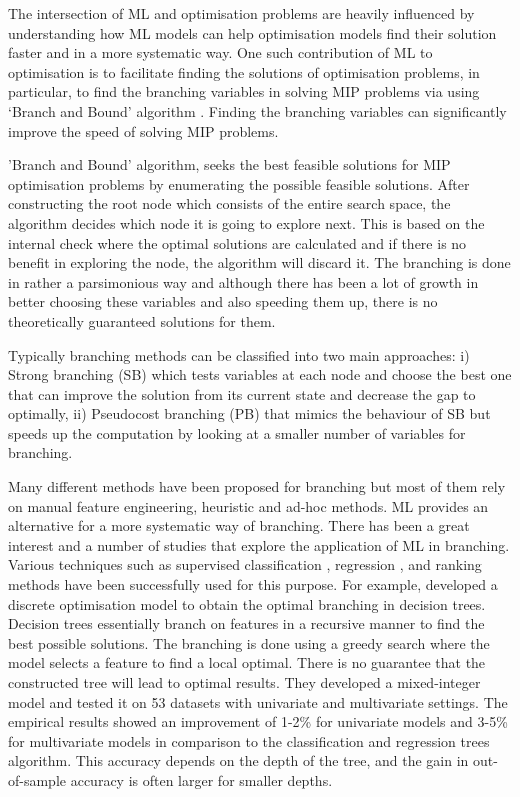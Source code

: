 \documentclass[graybox]{svmult}
\begin{document}
The intersection of ML and optimisation problems are heavily influenced by understanding how ML models can help optimisation models find their solution faster and in a more systematic way. One such contribution of ML to optimisation is to facilitate finding the solutions of optimisation problems, in particular, to find the branching variables in solving MIP problems via using `Branch and Bound' algorithm \cite{bertsimas2017optimal}. Finding the branching variables can significantly improve the speed of solving MIP problems.

'Branch and Bound' algorithm, seeks the best feasible solutions for MIP optimisation problems by enumerating the possible feasible solutions. After constructing the root node which consists of the entire search space, the algorithm decides which node it is going to explore next. This is based on the internal check where the optimal solutions are calculated and if there is no benefit in exploring the node, the algorithm will discard it.  The branching is done in rather a parsimonious way and although there has been a lot of growth in better choosing these variables and also speeding them up, there is no theoretically guaranteed solutions for them. 


Typically branching methods can be classified into two main approaches: i) Strong branching (SB) which tests variables at each node and choose the best one that can improve the solution from its current state and decrease the gap to optimally, ii) Pseudocost branching (PB) that mimics the behaviour of SB but speeds up the computation by looking at a smaller number of variables for branching. 

Many different methods have been proposed for branching but most of them rely on manual feature engineering, heuristic and ad-hoc methods. ML provides an alternative for a more systematic way of branching.  There has been a great interest and a number of studies that explore the application of ML in branching. Various techniques such as supervised classification \cite{marcos2015machine}, regression \cite{Daume_undated-vo}, and ranking \cite{Khalil_undated-qm} methods have been successfully used for this purpose. For example, \citet{bertsimas2017optimal} developed a discrete optimisation model to obtain the optimal branching in decision trees. Decision trees essentially branch on features in a recursive manner to find the best possible solutions. The branching is done using a greedy search where the model selects a feature to find a local optimal. There is no guarantee that the constructed tree will lead to optimal results. They developed a mixed-integer model and tested it on 53 datasets with univariate and multivariate settings. The empirical results showed an improvement of 1-2\% for univariate models and 3-5\% for multivariate models in comparison to the classification and regression trees algorithm. This accuracy depends on the depth of the tree, and the gain in out-of-sample accuracy is often larger for smaller depths.
\end{document}
